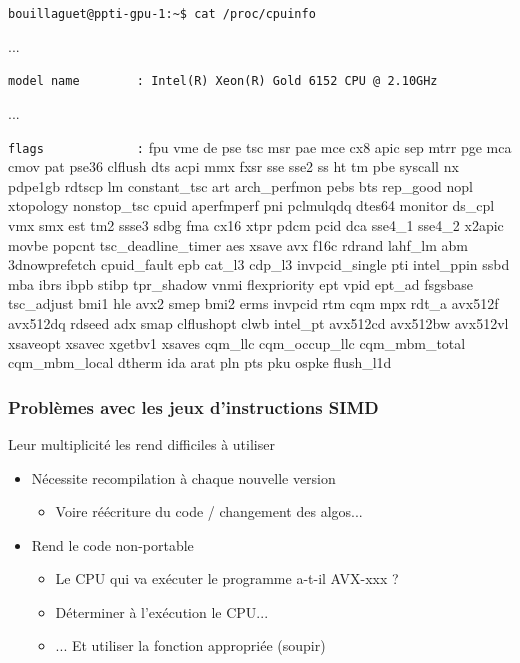 \documentclass[xcolor={x11names,svgnames}]{beamer}
\begin{document}

\begin{frame}[fragile]

\verb|bouillaguet@ppti-gpu-1:~$ cat /proc/cpuinfo|

\ttfamily\scriptsize
...

\verb|model name        : Intel(R) Xeon(R) Gold 6152 CPU @ 2.10GHz|

...

\verb|flags             :| fpu vme de pse tsc msr pae mce cx8 apic sep mtrr pge mca cmov pat pse36 clflush dts acpi \alert{mmx} fxsr \alert{sse sse2} ss ht tm pbe syscall nx pdpe1gb rdtscp lm constant\_tsc art arch\_perfmon pebs bts rep\_good nopl xtopology nonstop\_tsc cpuid aperfmperf pni pclmulqdq dtes64 monitor ds\_cpl vmx smx est tm2 \alert{ssse3} sdbg fma cx16 xtpr pdcm pcid dca \alert{sse4\_1 sse4\_2} x2apic movbe popcnt tsc\_deadline\_timer aes xsave \alert{avx} f16c rdrand lahf\_lm abm 3dnowprefetch cpuid\_fault epb cat\_l3 cdp\_l3 invpcid\_single pti intel\_ppin ssbd mba ibrs ibpb stibp tpr\_shadow vnmi flexpriority ept vpid ept\_ad fsgsbase tsc\_adjust bmi1 hle \alert{avx2} smep bmi2 erms invpcid rtm cqm mpx rdt\_a \alert{avx512f avx512dq} rdseed adx smap clflushopt clwb intel\_pt \alert{avx512cd avx512bw avx512vl} xsaveopt xsavec xgetbv1 xsaves cqm\_llc cqm\_occup\_llc cqm\_mbm\_total cqm\_mbm\_local dtherm ida arat pln pts pku ospke flush\_l1d
\end{frame}


\begin{frame}
  \frametitle{Problèmes avec les jeux d'instructions SIMD}

  Leur multiplicité les rend difficiles à utiliser

  \bigskip
  
  \begin{itemize}
  \item Nécessite recompilation à chaque nouvelle version
    \begin{itemize}
    \item Voire réécriture du code / changement des algos... 
    \end{itemize}

    \medskip
    
  \item Rend le code non-portable
    \begin{itemize}
    \item Le CPU qui va exécuter le programme a-t-il AVX-xxx ? 
    \item Déterminer \alert{à l'exécution} le CPU...
    \item ... Et utiliser la fonction appropriée (soupir)
    \end{itemize}
    
  \end{itemize}
\end{frame}
\end{document}
